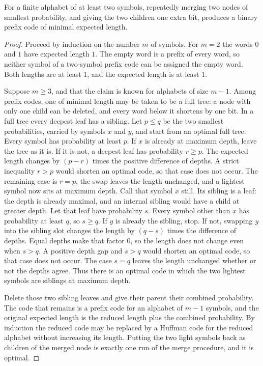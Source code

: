 \begin{theorem}\label{thm:huffman}
For a finite alphabet of at least two symbols, repeatedly merging two nodes of smallest probability, and giving the two children one extra bit, produces a binary prefix code of minimal expected length.
\end{theorem}
\begin{proof}
Proceed by induction on the number $m$ of symbols. For $m=2$ the words $0$ and $1$ have expected length $1$. The empty word is a prefix of every word, so neither symbol of a two-symbol prefix code can be assigned the empty word. Both lengths are at least $1$, and the expected length is at least $1$.

Suppose $m\ge 3$, and that the claim is known for alphabets of size $m-1$. Among prefix codes, one of minimal length may be taken to be a full tree: a node with only one child can be deleted, and every word below it shortens by one bit. In a full tree every deepest leaf has a sibling. Let $p\le q$ be the two smallest probabilities, carried by symbols $x$ and $y$, and start from an optimal full tree. Every symbol has probability at least $p$. If $x$ is already at maximum depth, leave the tree as it is. If it is not, a deepest leaf has probability $r\ge p$. The expected length changes by $(p-r)$ times the positive difference of depths. A strict inequality $r>p$ would shorten an optimal code, so that case does not occur. The remaining case is $r=p$, the swap leaves the length unchanged, and a lightest symbol now sits at maximum depth. Call that symbol $x$ still. Its sibling is a leaf: the depth is already maximal, and an internal sibling would have a child at greater depth. Let that leaf have probability $s$. Every symbol other than $x$ has probability at least $q$, so $s\ge q$. If $y$ is already the sibling, stop. If not, swapping $y$ into the sibling slot changes the length by $(q-s)$ times the difference of depths. Equal depths make that factor $0$, so the length does not change even when $s>q$. A positive depth gap and $s>q$ would shorten an optimal code, so that case does not occur. The case $s=q$ leaves the length unchanged whether or not the depths agree. Thus there is an optimal code in which the two lightest symbols are siblings at maximum depth.

Delete those two sibling leaves and give their parent their combined probability. The code that remains is a prefix code for an alphabet of $m-1$ symbols, and the original expected length is the reduced length plus the combined probability. By induction the reduced code may be replaced by a Huffman code for the reduced alphabet without increasing its length. Putting the two light symbols back as children of the merged node is exactly one run of the merge procedure, and it is optimal.
\end{proof}

